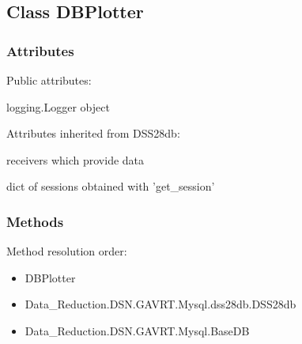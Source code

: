 \documentclass[letterpaper,11pt]{report}
\begin{document}
\subsection{Class {\ttfamily DBPlotter}}\label{sec:dbplotter}

\subsubsection{Attributes} 

Public attributes:
\begin{description}\itemsep0pt \parskip0pt 
    \item[logger] logging.Logger object
\end{description}

\noindent Attributes inherited from DSS28db:
\begin{description}\itemsep0pt \parskip0pt 
    \item[receiver] receivers which provide data
    \item[sessions] dict of sessions obtained with 'get\_session'
\end{description}

\subsubsection{Methods}

Method resolution order:
\begin{itemize}\itemsep0pt \parskip0pt 
    \item DBPlotter
    \item Data\_Reduction.DSN.GAVRT.Mysql.dss28db.DSS28db
    \item Data\_Reduction.DSN.GAVRT.Mysql.BaseDB
\end{itemize}
\end{document}
